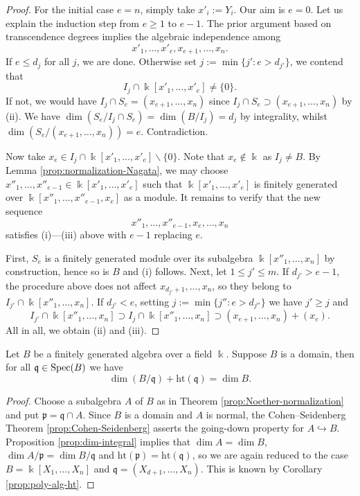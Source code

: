 \begin{proof}
	For the initial case $e=n$, simply take $x'_i := Y_i$. Our aim is $e=0$. Let us explain the induction step from $e \geq 1$ to $e-1$. The prior argument based on transcendence degrees implies the algebraic independence among
	\[ x'_1, \ldots, x'_e, x_{e+1}, \ldots, x_n. \]
	If $e \leq d_j$ for all $j$, we are done. Otherwise set $j := \min\{j': e > d_{j'} \}$, we contend that
	\[ I_j \cap \Bbbk[x'_1, \ldots, x'_e] \neq \{0\}. \]
	If not, we would have $I_j \cap S_e = (x_{e+1}, \ldots, x_n)$ since $I_j \cap S_e \supset (x_{e+1}, \ldots, x_n)$ by (ii). We have $\dim(S_e/I_j \cap S_e) = \dim(B/I_j) = d_j$ by integrality, whilst $\dim(S_e/(x_{e+1}, \ldots, x_n)) = e$. Contradiction.
	
	Now take $x_e \in I_j \cap \Bbbk[x'_1, \ldots, x'_e] \smallsetminus \{0\}$. Note that $x_e \notin \Bbbk$ as $I_j \neq B$. By Lemma \ref{prop:normalization-Nagata}, we may choose $x''_1, \ldots, x''_{e-1} \in \Bbbk[x'_1, \ldots, x'_e]$ such that $\Bbbk[x'_1, \ldots, x'_e]$ is finitely generated over $\Bbbk[x''_1, \ldots, x''_{e-1}, x_e]$ as a module. It remains to verify that the new sequence
	\[ x''_1, \ldots, x''_{e-1}, x_e, \ldots, x_n \]
	satisfies (i)---(iii) above with $e-1$ replacing $e$.
	
	First, $S_e$ is a finitely generated module over its subalgebra $\Bbbk[x''_1, \ldots, x_n]$ by construction, hence so is $B$ and (i) follows. Next, let $1 \leq j' \leq m$. If $d_{j'} > e-1$, the procedure above does not affect $x_{d_{j'} + 1}, \ldots, x_n$, so they belong to $I_{j'} \cap \Bbbk[x''_1, \ldots, x_n]$. If $d_{j'} < e$, setting $j := \min\{j'' : e > d_{j''} \}$ we have $j' \geq j$ and
	\[ I_{j'} \cap \Bbbk[x''_1, \ldots, x_n] \supset I_j \cap \Bbbk[x''_1, \ldots, x_n] \supset (x_{e+1}, \ldots, x_n) + (x_e). \]
	All in all, we obtain (ii) and (iii).
\end{proof}

\begin{corollary}\label{prop:fg-dim-formula}
	Let $B$ be a finitely generated algebra over a field $\Bbbk$. Suppose $B$ is a domain, then for all $\mathfrak{q} \in \operatorname{Spec}(B)$ we have
	\[ \dim(B/\mathfrak{q}) + \mathrm{ht}(\mathfrak{q}) = \dim B. \]
\end{corollary}
\begin{proof}
	Choose a subalgebra $A$ of $B$ as in Theorem \ref{prop:Noether-normalization} and put $\mathfrak{p} = \mathfrak{q} \cap A$. Since $B$ is a domain and $A$ is normal, the Cohen--Seidenberg Theorem \ref{prop:Cohen-Seidenberg} asserts the going-down property for $A \hookrightarrow B$. Proposition \ref{prop:dim-integral} implies that $\dim A = \dim B$, $\dim A/\mathfrak{p} = \dim B/\mathfrak{q}$ and $\text{ht}(\mathfrak{p}) = \text{ht}(\mathfrak{q})$, so we are again reduced to the case $B = \Bbbk[X_1, \ldots, X_n]$ and $\mathfrak{q} = (X_{d+1}, \ldots, X_n)$. This is known by Corollary \ref{prop:poly-alg-ht}.
\end{proof}

